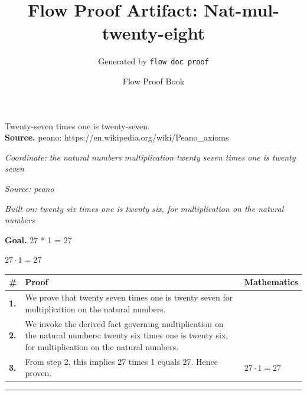\documentclass[11pt]{article}
\title{Flow Proof Artifact: Nat-mul-twenty-eight}
\author{Generated by \texttt{flow doc proof}}
\date{Flow Proof Book}
\theoremstyle{definition}
\begin{document}
\maketitle
Twenty-seven times one is twenty-seven.\\[0.5em]
\textbf{Source.} peano: https://en.wikipedia.org/wiki/Peano\_axioms\\[0.5em]
\bigskip
{}\par
\smallskip\noindent\textit{Coordinate: the natural numbers \cdot multiplication \cdot twenty seven times one is twenty seven}\par
\smallskip\noindent\textit{Source: peano}\par
\smallskip\noindent\textit{Built on: twenty six times one is twenty six, for multiplication on the natural numbers}\par
\medskip
\noindent\textbf{Goal.} 27 * 1 = 27\par
\noindent$\displaystyle 27 \cdot 1 = 27$\par
\medskip
\noindent
\begin{tabular}{@{} >{\raggedright\arraybackslash}p{} >{\raggedright\arraybackslash}p{} >{\raggedleft\arraybackslash}p{} @{}}
\textbf{\#} & \textbf{Proof} & \textbf{Mathematics} \\
\midrule
\textbf{1.} & We prove that twenty seven times one is twenty seven for multiplication on the natural numbers. & \\[0.45em]
\textbf{2.} & We invoke the derived fact governing multiplication on the natural numbers: twenty six times one is twenty six, for multiplication on the natural numbers. & \\[0.45em]
\textbf{3.} & From step 2, this implies 27 times 1 equals 27. Hence proven. & $\displaystyle 27 \cdot 1 = 27$ \\[0.45em]
\bottomrule
\end{tabular}
\label{thm:Nat-multiplication-twenty_seven_times_one_is_twenty_seven}
\par\medskip\hrule
\end{document}
